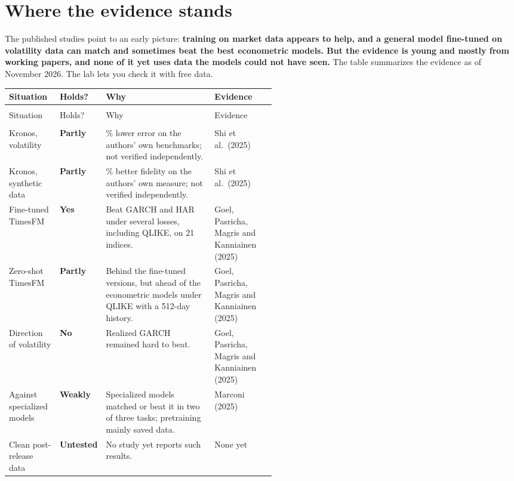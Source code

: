 \section{Where the evidence stands}
\label{sec:23-verdict}

The published studies point to an early picture: \textbf{training on market data appears to help, and a general model fine-tuned on volatility data can match and sometimes beat the best econometric models. But the evidence is young and mostly from working papers, and none of it yet uses data the models could not have seen.} The table summarizes the evidence as of November 2026. The lab lets you check it with free data.

{\small
\begin{longtable}{@{}>{\raggedright\arraybackslash}p{0.19\linewidth}>{\raggedright\arraybackslash}p{0.10\linewidth}>{\raggedright\arraybackslash}p{}>{\raggedright\arraybackslash}p{0.23\linewidth}@{}}
\toprule
Situation & Holds? & Why & Evidence \\
\midrule
\endfirsthead
\multicolumn{4}{@{}l}{\emph{(continued)}} \\
\toprule
Situation & Holds? & Why & Evidence \\
\midrule
\endhead
\midrule
\multicolumn{4}{r@{}}{\emph{(continued on the next page)}} \\
\endfoot
\bottomrule
\endlastfoot
Kronos, volatility & \textbf{Partly} & 9\% lower error on the authors' own benchmarks; not verified independently. & Shi et al.\ (2025) \\
\addlinespace[3pt]
Kronos, synthetic data & \textbf{Partly} & 22\% better fidelity on the authors' own measure; not verified independently. & Shi et al.\ (2025) \\
\addlinespace[3pt]
Fine-tuned TimesFM & \textbf{Yes} & Beat GARCH and HAR under several losses, including QLIKE, on 21 indices. & Goel, Pasricha, Magris and Kanniainen (2025) \\
\addlinespace[3pt]
Zero-shot TimesFM & \textbf{Partly} & Behind the fine-tuned versions, but ahead of the econometric models under QLIKE with a 512-day history. & Goel, Pasricha, Magris and Kanniainen (2025) \\
\addlinespace[3pt]
Direction of volatility & \textbf{No} & Realized GARCH remained hard to beat. & Goel, Pasricha, Magris and Kanniainen (2025) \\
\addlinespace[3pt]
Against specialized models & \textbf{Weakly} & Specialized models matched or beat it in two of three tasks; pretraining mainly saved data. & Marconi (2025) \\
\addlinespace[3pt]
Clean post-release data & \textbf{Untested} & No study yet reports such results. & None yet \\
\end{longtable}
}

